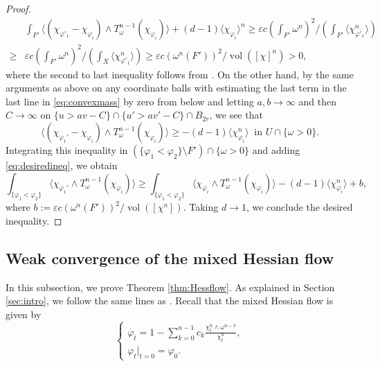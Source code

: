 \documentclass[10pt,a4paper]{amsart}
\numberwithin{equation}{section}
\begin{document}
\begin{proof}
    \begin{equation}\label{eq:desiredineq}
        \begin{aligned}
            &\int_{F'}\Big\langle\left(\chi_{\varphi'_1}-\chi_{\varphi_i}\right)\wedge T^{n-1}_\omega(\chi_{\varphi_i})\Big\rangle+(d-1)\langle\chi_{\varphi_i}\rangle^n
            \ge\varepsilon c \left(\int_{F'}\omega^n\right)^2\Bigg/\left(\int_{F'}\big\langle\chi_{\varphi'_1}^n\big\rangle\right)\\
            \ge&\varepsilon c \left(\int_{F'}\omega^n\right)^2\Bigg/\left(\int_X\big\langle\chi_{\varphi'_1}^n\big\rangle\right)\ge\varepsilon c \left(\omega^n(F')\right)^2/\operatorname{vol}([\chi]^n)>0,
        \end{aligned}
    \end{equation}
    where the second to last inequality follows from \cite[Proposition 1.20]{BEGZ}. On the other hand, by the same arguments as above on any coordinate balls with estimating the last term in the last line in \eqref{eq:convexmass} by zero from below and letting $a,b\to\infty$ and then $C\to\infty$ on $\{u>av-C\}\cap\{u'>av'-C\}\cap B_{2r}$, we see that
    \begin{equation*}
        \Big\langle(\chi_{\varphi_1'}-\chi_{\varphi_i})\wedge T^{n-1}_{\omega}(\chi_{\varphi_i})\Big\rangle\ge -(d-1)\langle\chi_{\varphi_i}^n\rangle \ \text{ in } U\cap\{\omega>0\}.
    \end{equation*}
    Integrating this inequality in $(\{\varphi_1<\varphi_2\}\setminus F')\cap\{\omega>0\}$ and adding \eqref{eq:desiredineq}, we obtain
    \begin{equation*}
        \int_{\{\varphi_1<\varphi_2\}}\Big\langle\chi_{\varphi_1'}\wedge T^{n-1}_\omega(\chi_{\varphi_i})\Big\rangle\ge\int_{\{\varphi_1<\varphi_2\}}\Big\langle\chi_{\varphi
        _i}\wedge T^{n-1}_\omega(\chi_{\varphi_i})\Big\rangle-(d-1)\langle\chi_{\varphi_i}^n\rangle+b,
    \end{equation*}
    where $b:=\varepsilon c (\omega^n(F'))^2/\operatorname{vol}([\chi^n])$. Taking $d\to1$, we conclude the desired inequality.
\end{proof}

\subsection{Weak convergence of the mixed Hessian flow}\label{subsec:mixedHessianflow}
In this subsection, we prove Theorem \ref{thm:Hessflow}. As explained in Section \ref{sec:intro}, we follow the same lines as \cite{Mur}. Recall that the mixed Hessian flow is given by
\begin{equation}\label{eq:mixedHessianflowre}
    \begin{cases}
        \dot{\varphi_t}=1-\sum_{k=0}^{n-1}c_k\frac{\chi_t^k\wedge\omega^{n-k}}{\chi_t^n},\\
        \varphi_t|_{t=0}=\varphi_0.
    \end{cases}
\end{equation}
\end{document}
